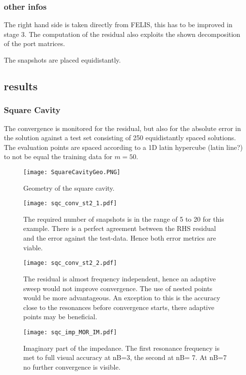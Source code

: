 \subsubsection{other infos}
The right hand side is taken directly from FELIS, this has to be improved in stage 3. The computation of the residual also exploits the shown decomposition of the port matrices.

The snapshots are placed equidistantly.

\subsection{results}
\subsubsection{Square Cavity}
The convergence is monitored for the residual, but also for the absolute error in the solution against a test set consisting of 250 equidistantly spaced solutions. The evaluation points are spaced according to a 1D latin hypercube (latin line?) to not be equal the training data for $m=50$.


\begin{figure}[h]
	\centering
	\texttt{[image: SquareCavityGeo.PNG]}
	\caption{Geometry of the square cavity.}
	\label{}
\end{figure}

\begin{figure}[h]
	\centering
	\texttt{[image: sqc\_conv\_st2\_1.pdf]}
	\caption{The required number of snapshots is in the range of 5 to 20 for this example. There is a perfect agreement between the RHS residual and the error against the test-data. Hence both error metrics are viable.}
	\label{}
\end{figure}
\begin{figure}[h]
	\centering
	\texttt{[image: sqc\_conv\_st2\_2.pdf]}
	\caption{The residual is almost frequency independent, hence an adaptive sweep would not improve convergence. The use of nested points would be more advantageous. An exception to this is the accuracy close to the resonances before convergence starts, there adaptive points may be beneficial.}
	\label{}
\end{figure}
\begin{figure}[h]
	\centering
	\texttt{[image: sqc\_imp\_MOR\_IM.pdf]}
	\caption{Imaginary part of the impedance. The first resonance frequency is met to full visual accuracy at nB=3, the second at nB= 7. At nB=7 no further convergence is visible.}
	\label{}
\end{figure}

